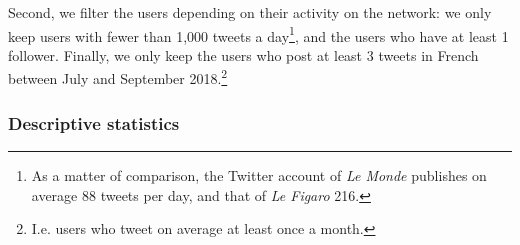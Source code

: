 Second, we filter the users depending on their activity on the network: we only keep users with fewer than 1,000 tweets a day\footnote{As a matter of comparison, the Twitter account of \textit{Le Monde} publishes on average 88 tweets per day, and that of \textit{Le Figaro} 216.}, and the users who have at least 1 follower. Finally, we only keep the users who post at least 3 tweets in French between July and September 2018.\footnote{I.e. users who tweet on average at least once a month.}


\subsubsection{Descriptive statistics}

%
%
%
%	
%

